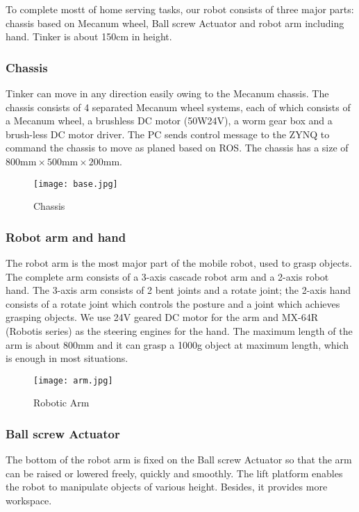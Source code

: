 To complete mostt of home serving tasks, our robot consists of three major parts: chassis based on Mecanum wheel, Ball screw Actuator and robot arm including hand. Tinker is about 150cm in height. 
\subsubsection{Chassis}
Tinker can move in any direction easily owing to the Mecanum chassis. The chassis consists of 4 separated Mecanum wheel systems, each of which consists of a Mecanum wheel, a brushless DC motor (50W24V), a worm gear box and a brush-less DC motor driver. The PC sends control message to the ZYNQ to command the chassis to move as planed based on ROS. The chassis has a size of $800\text{mm} \times 500\text{mm}\times 200\text{mm}$.
\begin{figure}[!t]
\centering
\texttt{[image: base.jpg]}
    \caption{Chassis}
\end{figure}

\subsubsection{Robot arm and hand}
The robot arm is the most major part of the mobile robot, used to grasp objects. The complete arm consists of a 3-axis cascade robot arm and a 2-axis robot hand. The 3-axis arm consists of 2 bent joints and a rotate joint; the 2-axis hand consists of a rotate joint which controls the posture and a joint which achieves grasping objects. We use 24V geared DC motor for the arm and MX-64R (Robotis series) as the steering engines for the hand. The maximum length of the arm is about 800mm and it can grasp a 1000g object at maximum length, which is enough in most situations. 
\begin{figure*}[!t]
	\centering
    \texttt{[image: arm.jpg]}
    \caption{Robotic Arm}
\end{figure*}

\subsubsection{Ball screw Actuator}
The bottom of the robot arm is fixed on the Ball screw Actuator so that the arm can be raised or lowered freely, quickly and smoothly. The lift platform enables the robot to manipulate objects of various height. Besides, it provides more workspace.


